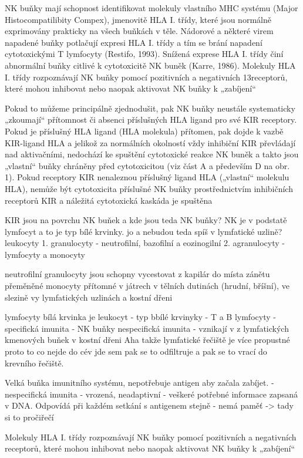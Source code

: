 \documentclass[czech,DP]{thesiskiv}
\begin{document}
NK buňky mají schopnost identifikovat molekuly vlastního MHC systému (Major
Histocompatilibity Compex), jmenovitě HLA I. třídy, které jsou normálně exprimovány
prakticky na všech buňkách v těle. Nádorové a některé virem napadené buňky potlačují
expresi HLA I. třídy a tím se brání napadení cytotoxickými T lymfocyty (Restifo, 1993).
Snížená exprese HLA I. třídy činí abnormální buňky citlivé k cytotoxicitě NK buněk (Karre,
1986). Molekuly HLA I. třídy rozpoznávají NK buňky pomocí pozitivních a negativních
13receptorů, které mohou inhibovat nebo naopak aktivovat NK buňky k „zabíjení“

Pokud to můžeme principálně zjednodušit, pak NK buňky neustále
systematicky „zkoumají“ přítomnost či absenci příslušných HLA
ligand pro své KIR receptory. Pokud je příslušný HLA ligand (HLA
molekula) přítomen, pak dojde k vazbě KIR-ligand HLA a jelikož za
normálních okolností vždy inhibiční KIR převládají nad aktivačními,
nedochází ke spuštění cytotoxické reakce NK buněk a takto jsou
„vlastní“ buňky chráněny před cytotoxicitou (viz část A a především D
na obr. 1). Pokud receptory KIR nenaleznou příslušný ligand HLA
(„vlastní“ molekulu HLA), nemůže být cytotoxicita příslušné NK buňky
prostřednictvím inhibičních receptorů KIR a náležitá cytotoxická
kaskáda je spuštěna


KIR jsou na povrchu NK buňek a kde jsou teda NK buňky? 
NK je v podstatě lymfocyt a to je typ bílé krvinky. jo a nebudou teda spíš  v lymfatické uzlině? 
leukocyty 1. granulocyty - neutrofilní, bazofilní a eozinogilní
		2. agranulocyty - lymfocyty a monocyty
		
neutrofilní granulocyty jsou schopny vycestovat z kapilár do místa zánětu
přeměněné monocyty přítomné v játrech v tělních dutinách (hrudní, bříšní), ve slezině vy lymfatických uzlinách a kostní dřeni

lymfocyty 
bílá krvinka je leukocyt
- typ bbílé krvinyky 
- T a B lymfocyty - specifická imunita
- NK buňky nespecifická imunita
- vznikají v z lymfatických kmenových buňek v kostní dřeni
Aha takže lymfatické řečiště je více propustné proto to co nejde do cév jde sem pak se to odfiltruje a pak se to vrací do krevního řečiště.

Velká buňka imunitního systému, nepotřebuje antigen aby začala zabíjet. 
-nespecifická imunita - vrozená, neadaptivní - veškeré potřebné informace zapsaná v DNA. Odpovídá při každém setkání s antigenem stejně - nemá paměť -> tady si to pročiřečí

Molekuly HLA I. třídy rozpoznávají NK buňky pomocí pozitivních a negativních receptorů, které mohou inhibovat nebo naopak aktivovat NK buňky k „zabíjení“
\end{document}
